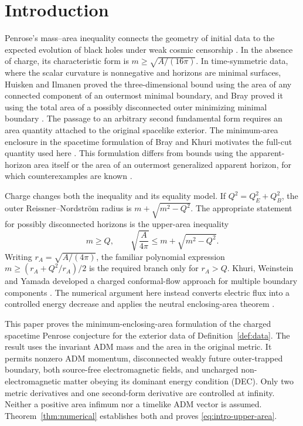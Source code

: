 \section{Introduction}\label{sec:introduction}

Penrose's mass--area inequality connects the geometry of initial data to
the expected evolution of black holes under weak cosmic censorship
\cite{Penrose1973}. In the absence of charge, its characteristic form is
$m\ge\sqrt{A/(16\pi)}$. In time-symmetric data, where the scalar
curvature is nonnegative and horizons are minimal surfaces,
Huisken and Ilmanen proved the three-dimensional bound using the area of
any connected component of an outermost minimal boundary, and Bray proved
it using the total area of a possibly disconnected outer minimizing
minimal boundary \cite{HuiskenIlmanen2001,Bray2001}. The passage to an
arbitrary second fundamental form requires an area quantity attached to
the original spacelike exterior. The minimum-area enclosure in the
spacetime formulation of Bray and Khuri motivates the full-cut quantity
used here \cite{BrayKhuri2010}. This formulation differs from bounds using
the apparent-horizon area itself or the area of an outermost generalized
apparent horizon, for which counterexamples are known
\cite{BenDov2004,CarrascoMars2010}.

Charge changes both the inequality and its equality model. If
$Q^2=Q_E^2+Q_B^2$, the outer Reissner--Nordstr\"om radius is
$m+\sqrt{m^2-Q^2}$. The appropriate statement for possibly disconnected
horizons is the upper-area inequality
\begin{equation}\label{eq:intro-upper-area}
 m\ge Q,\qquad
 \sqrt{\frac{A}{4\pi}}\le m+\sqrt{m^2-Q^2}.
\end{equation}
Writing $r_A=\sqrt{A/(4\pi)}$, the familiar polynomial expression
$m\ge(r_A+Q^2/r_A)/2$ is the required branch only for $r_A>Q$.
Khuri, Weinstein and Yamada developed a charged conformal-flow approach
for multiple boundary components \cite{KhuriWeinsteinYamada2017}.
The numerical argument here instead converts electric flux into a
controlled energy decrease and applies the neutral enclosing-area
theorem \cite[Theorem~1.3]{NeutralEnclosingArea2026}.

This paper proves the minimum-enclosing-area formulation of the charged
spacetime Penrose conjecture for the exterior data of
Definition~\ref{def:data}. The result uses the invariant ADM mass and the
area in the original metric. It permits nonzero ADM momentum,
disconnected weakly future outer-trapped boundary, both source-free
electromagnetic fields, and uncharged non-electromagnetic matter obeying
its dominant energy condition (DEC). Only two metric derivatives and one
second-form derivative are controlled at infinity. Neither a positive
area infimum nor a timelike ADM vector is assumed. Theorem~\ref{thm:numerical}
establishes both and proves \eqref{eq:intro-upper-area}.

